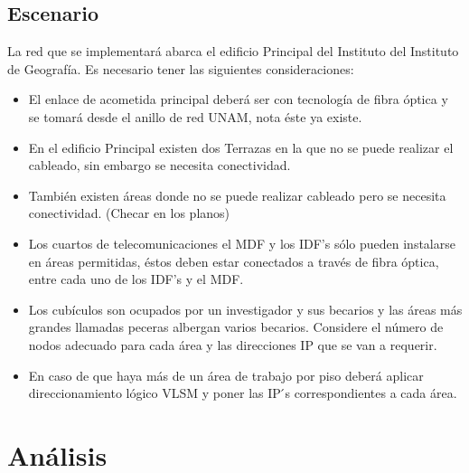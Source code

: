 \documentclass[letterpaper]{article}
\begin{document}
\subsection{Escenario}\label{sec:esc}

La red que se implementará abarca el edificio Principal del Instituto del Instituto
de Geografía. Es necesario tener las siguientes consideraciones:
\begin{itemize}
\item El enlace de acometida principal deberá ser con tecnología de fibra
  óptica y se tomará desde el anillo de red UNAM, nota éste ya existe.
  
\item  En el edificio Principal existen dos Terrazas en la que no se puede realizar
el cableado, sin embargo se necesita conectividad.

\item También existen áreas donde no se puede realizar cableado pero se
  necesita conectividad. (Checar en los planos)
  
\item  Los cuartos de telecomunicaciones el MDF y los IDF’s sólo pueden
instalarse en áreas permitidas, éstos deben estar conectados a través de
fibra óptica, entre cada uno de los IDF’s y el MDF.\@

\item Los cubículos son ocupados por un investigador y sus becarios y las áreas
más grandes llamadas peceras albergan varios becarios. Considere el
número de nodos adecuado para cada área y las direcciones IP que se
van a requerir.

\item  En caso de que haya más de un área de trabajo por piso deberá aplicar
direccionamiento lógico VLSM y poner las IP ́s correspondientes a cada
área.
\end{itemize}


\section{Análisis}\label{sec:ana}


\end{document}
